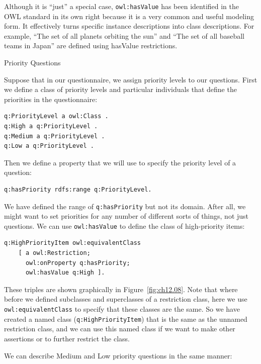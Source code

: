 Although it is ``just'' a special case, \texttt{owl:hasValue} has been identified
in the OWL standard in its own right because it is a very common and
useful modeling form. It effectively turns specific instance
descriptions into class descriptions. For example, ``The set of all
planets orbiting the sun'' and ``The set of all baseball teams in
Japan'' are defined using hasValue restrictions.

\begin{example}{Priority Questions}

Suppose that in our questionnaire, we assign priority levels to our
questions. First we define a class of priority levels and particular
individuals that define the priorities in the questionnaire:

\begin{lstlisting}
q:PriorityLevel a owl:Class .
q:High a q:PriorityLevel .
q:Medium a q:PriorityLevel .
q:Low a q:PriorityLevel .
\end{lstlisting}

Then we define a property that we will use to specify the priority level
of a question:

\begin{lstlisting}
q:hasPriority rdfs:range q:PriorityLevel.
\end{lstlisting}
\end{example}

We have defined the range of \texttt{q:hasPriority} but not its domain. After
all, we might want to set priorities for any number of different sorts
of things, not just questions. We can use \texttt{owl:hasValue} to define the
class of high-priority items:

\begin{lstlisting}
q:HighPriorityItem owl:equivalentClass
    [ a owl:Restriction;
      owl:onProperty q:hasPriority;
      owl:hasValue q:High ].
\end{lstlisting}

These triples are shown graphically in Figure~\ref{fig:ch12.08}. Note that where
before we defined subclasses and superclasses of a restriction class,
here we use \texttt{owl:equivalentClass} to specify that these classes are the
same. So we have created a named class (\texttt{q:HighPriorityItem}) that is the
same as the unnamed restriction class, and we can use this named class
if we want to make other assertions or to further restrict the class.

We can describe Medium and Low priority questions in the same manner:

